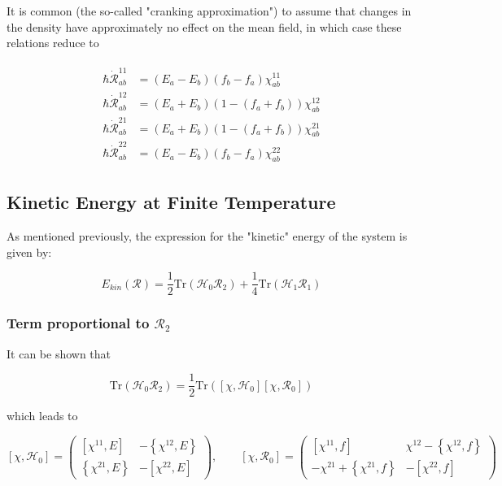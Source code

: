 It is common (the so-called "cranking approximation") to assume that changes in the density have approximately no effect on the mean field, in which case these relations reduce to

\begin{tcolorbox}
\begin{align}\label{eqn:chi-rdot}
\begin{aligned}
\hbar \dot{\mathcal{R}}_{ab}^{11} &= (E_a-E_b)(f_b-f_a)\chi_{ab}^{11} \\
\hbar \dot{\mathcal{R}}_{ab}^{12} &= (E_a+E_b)\left(1-(f_a+f_b)\right)\chi_{ab}^{12} \\
\hbar \dot{\mathcal{R}}_{ab}^{21} &= (E_a+E_b)\left(1-(f_a+f_b)\right)\chi_{ab}^{21} \\
\hbar \dot{\mathcal{R}}_{ab}^{22} &= (E_a-E_b)(f_b-f_a)\chi_{ab}^{22}
\end{aligned}
\end{align}
\end{tcolorbox}

\subsection{Kinetic Energy at Finite Temperature}

As mentioned previously, the expression for the "kinetic" energy of the system is given by:

\begin{equation*}
E_{kin}(\mathcal{R}) = \frac{1}{2}\mathrm{Tr}\left(\mathcal{H}_0\mathcal{R}_2\right) + \frac{1}{4}\mathrm{Tr}\left(\mathcal{H}_1\mathcal{R}_1\right)
\end{equation*}

\subsubsection{Term proportional to $\mathcal{R}_2$}

It can be shown that

\begin{equation*}
\mathrm{Tr}\left(\mathcal{H}_0\mathcal{R}_2\right) = \frac{1}{2}\mathrm{Tr}\left(\left[\chi,\mathcal{H}_0\right]\left[\chi,\mathcal{R}_0\right]\right)
\end{equation*}

\noindent which leads to

\begin{equation*}
\left[\chi, \mathcal{H}_0\right] = \left(\begin{array}{cc}
[\chi^{11},E] & -\left\{\chi^{12},E\right\} \\
\left\{\chi^{21},E\right\} & -[\chi^{22},E]
\end{array}\right), \qquad
\left[\chi, \mathcal{R}_0\right] = \left(\begin{array}{cc}
[\chi^{11},f] & \chi^{12}-\left\{\chi^{12},f\right\} \\
-\chi^{21}+\left\{\chi^{21},f\right\} & -[\chi^{22},f]
\end{array}\right)
\end{equation*}

